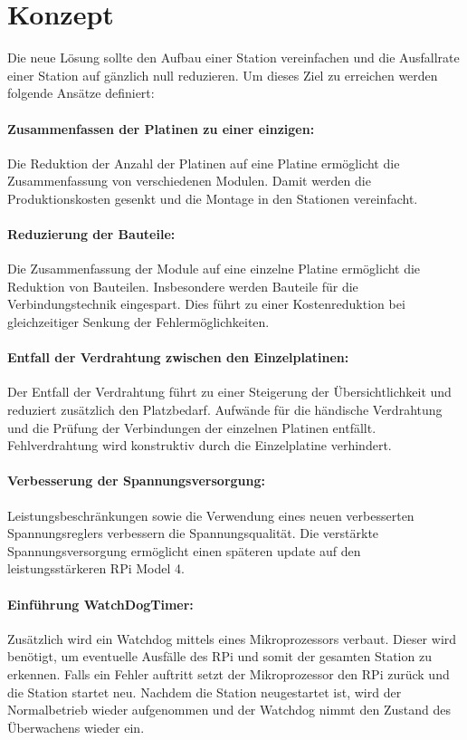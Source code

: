 \wip
\section{Konzept}
Die neue Lösung sollte den Aufbau einer Station vereinfachen und die Ausfallrate einer Station auf gänzlich null reduzieren.
Um dieses Ziel zu erreichen werden folgende Ansätze definiert:

\paragraph{Zusammenfassen der Platinen zu einer einzigen:}
Die Reduktion der Anzahl der Platinen auf eine Platine ermöglicht die Zusammenfassung von verschiedenen Modulen.
Damit werden die Produktionskosten gesenkt und die Montage in den Stationen vereinfacht.

\paragraph{Reduzierung der Bauteile:}
Die Zusammenfassung der Module auf eine einzelne Platine ermöglicht die Reduktion von Bauteilen.
Insbesondere werden Bauteile für die Verbindungstechnik eingespart.
Dies führt zu einer Kostenreduktion bei gleichzeitiger Senkung der Fehlermöglichkeiten. 

\paragraph{Entfall der Verdrahtung zwischen den Einzelplatinen:}
Der Entfall der Verdrahtung führt zu einer Steigerung der Übersichtlichkeit und reduziert zusätzlich den Platzbedarf.
Aufwände für die händische Verdrahtung und die Prüfung der Verbindungen der einzelnen Platinen entfällt.
Fehlverdrahtung wird konstruktiv durch die Einzelplatine verhindert.

\paragraph{Verbesserung der Spannungsversorgung:}
Leistungsbeschränkungen sowie die Verwendung eines neuen verbesserten Spannungsreglers verbessern die Spannungsqualität.
Die verstärkte Spannungsversorgung ermöglicht einen späteren update auf den leistungsstärkeren RPi Model 4.

\paragraph{Einführung WatchDogTimer:}
Zusätzlich wird ein Watchdog mittels eines Mikroprozessors verbaut.
Dieser wird benötigt, um eventuelle Ausfälle des RPi und somit der gesamten Station zu erkennen.
Falls ein Fehler auftritt setzt der Mikroprozessor den RPi zurück und die Station startet neu.
Nachdem die Station neugestartet ist, wird der Normalbetrieb wieder aufgenommen und der Watchdog nimmt den Zustand des Überwachens wieder ein.

